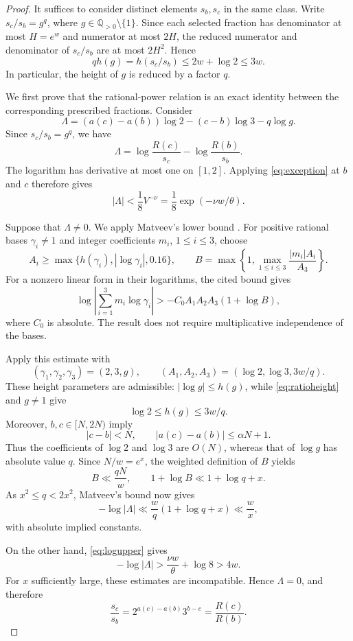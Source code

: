 \documentclass[11pt,reqno]{amsart}
\theoremstyle{definition}
\newcommand{\Q}{\mathbb Q}
\begin{document}
\begin{proof}
It suffices to consider distinct elements
$s_b,s_c$ in the same class. Write
$s_c/s_b=g^q$, where $g\in\Q_{>0}\setminus\{1\}$.
Since each selected fraction has denominator at
most $H=e^w$ and numerator at most $2H$, the
reduced numerator and denominator of $s_c/s_b$
are at most $2H^2$. Hence
\begin{equation}\label{eq:ratioheight}
 qh(g)=h(s_c/s_b)\le2w+\log2\le3w.
\end{equation}
In particular, the height of $g$ is reduced by
a factor $q$.

We first prove that the rational-power relation
is an exact identity between the corresponding
prescribed fractions. Consider
\[
 \Lambda=(a(c)-a(b))\log2
 -(c-b)\log3-q\log g.
\]
Since $s_c/s_b=g^q$, we have
\[
 \Lambda=
 \log\frac{R(c)}{s_c}
 -\log\frac{R(b)}{s_b}.
\]
The logarithm has derivative at most one on
$[1,2]$. Applying \eqref{eq:exception} at
$b$ and $c$ therefore gives
\begin{equation}\label{eq:logupper}
 |\Lambda|<\frac18V^{-\nu}
 =\frac18\exp(-\nu w/\theta).
\end{equation}

Suppose that $\Lambda\ne0$. We apply Matveev's
lower bound
\cite[Corollary~2.3, (2.6), with (1.3)]{Matveev}.
For positive rational bases
$\gamma_i\ne1$ and integer coefficients $m_i$,
$1\le i\le3$, choose
\[
 A_i\ge\max\{h(\gamma_i),|\log\gamma_i|,0.16\},
 \qquad
 B=\max\left\{1,\max_{1\le i\le3}
 \frac{|m_i|A_i}{A_3}\right\}.
\]
For a nonzero linear form in their logarithms,
the cited bound gives
\[
 \log\left|\sum_{i=1}^3m_i\log\gamma_i\right|
 >-C_0A_1A_2A_3(1+\log B),
\]
where $C_0$ is absolute. The result does not
require multiplicative independence of the bases.

Apply this estimate with
\[
 (\gamma_1,\gamma_2,\gamma_3)=(2,3,g),
 \qquad
 (A_1,A_2,A_3)=(\log2,\log3,3w/q).
\]
These height parameters are admissible:
$|\log g|\le h(g)$, while
\eqref{eq:ratioheight} and $g\ne1$ give
\[
 \log2\le h(g)\le3w/q.
\]
Moreover, $b,c\in[N,2N)$ imply
\[
 |c-b|<N,\qquad
 |a(c)-a(b)|\le\alpha N+1.
\]
Thus the coefficients of $\log2$ and $\log3$
are $O(N)$, whereas that of $\log g$ has
absolute value $q$. Since $N/w=e^x$, the
weighted definition of $B$ yields
\[
 B\ll\frac{qN}{w},
 \qquad
 1+\log B\ll1+\log q+x.
\]
As $x^2\le q<2x^2$, Matveev's bound now gives
\[
 -\log|\Lambda|
 \ll\frac{w}{q}(1+\log q+x)
 \ll\frac wx,
\]
with absolute implied constants.

On the other hand, \eqref{eq:logupper} gives
\[
 -\log|\Lambda|>
 \frac{\nu w}{\theta}+\log8>4w.
\]
For $x$ sufficiently large, these estimates
are incompatible. Hence $\Lambda=0$, and
therefore
\[
 \frac{s_c}{s_b}
 =2^{a(c)-a(b)}3^{b-c}
 =\frac{R(c)}{R(b)}.
\]


\end{proof}
\end{document}
